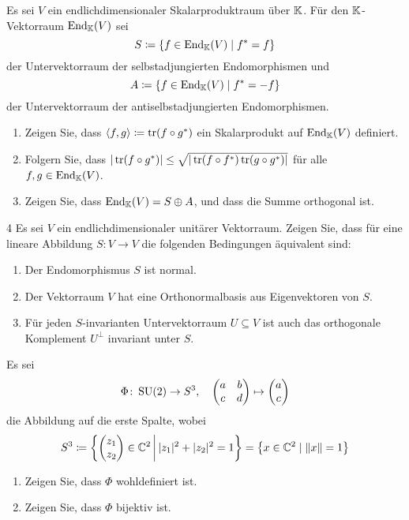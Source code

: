 

\begin{question}[subtitle = Ein Skalarprodukt auf dem Endomorphismenraum]{4}
  Es sei $V$ ein endlichdimensionaler Skalarproduktraum über $\mathbb{K}$.
  Für den $\mathbb{K}$-Vektorraum $\operatorname{End}_{\mathbb{K}}(V)$ sei
  \[
    S \coloneqq \{ f \in \operatorname{End}_{\mathbb{K}}(V) \mid f^* = f \}
  \]
  der Untervektorraum der selbstadjungierten Endomorphismen und
  \[
    A \coloneqq \{ f \in \operatorname{End}_{\mathbb{K}}(V) \mid f^* = -f \}
  \]
  der Untervektorraum der antiselbstadjungierten Endomorphismen.
  \begin{enumerate}[leftmargin=*]
    \item
      Zeigen Sie, dass $\langle f, g \rangle \coloneqq \operatorname{tr}(f \circ g^*)$ ein Skalarprodukt auf $\operatorname{End}_{\mathbb{K}}(V)$ definiert.
    \item
      Folgern Sie, dass $|\operatorname{tr}(f \circ g^*)| \leq \sqrt{|\operatorname{tr}(f \circ f^*) \operatorname{tr}(g \circ g^*)|}$ für alle $f, g \in \operatorname{End}_{\mathbb{K}}(V)$.
    \item
      Zeigen Sie, dass $\operatorname{End}_{\mathbb{K}}(V) = S \oplus A$, und dass die Summe orthogonal ist.
  \end{enumerate}
\end{question}


\begin{question}[subtitle = Charakterisierungen normaler Endomorphismen für unitäre Vektorräume]{4}
  Es sei $V$ ein endlichdimensionaler unitärer Vektorraum.
  Zeigen Sie, dass für eine lineare Abbildung $S \colon V \to V$ die folgenden Bedingungen äquivalent sind:
  \begin{enumerate}
    \item
      Der Endomorphismus $S$ ist normal.
    \item
      Der Vektorraum $V$ hat eine Orthonormalbasis aus Eigenvektoren von $S$.
    \item
      Für jeden $S$-invarianten Untervektorraum $U \subseteq V$ ist auch das orthogonale Komplement $U^\perp$ invariant unter $S$.
  \end{enumerate}
\end{question}


\begin{question}[subtitle = Eine Charakterisierung von $\SUnitary(2)$]{4}
  Es sei
  \[
    \Phi \colon \operatorname{SU}(2) \to S^3,
    \quad
    \begin{pmatrix}
      a & b \\
      c & d
    \end{pmatrix}
    \mapsto
    \begin{pmatrix} a \\ c \end{pmatrix}
  \]
  die Abbildung auf die erste Spalte, wobei
  \[
              S^3
    \coloneqq \left\{ \begin{pmatrix} z_1 \\ z_2 \end{pmatrix} \in \mathbb{C}^2 \,\middle|\, |z_1|^2 + |z_2|^2 = 1 \right\}
    =         \left\{ x \in \mathbb{C}^2 \mid \|x\| = 1 \right\}
  \]
  \begin{enumerate}[leftmargin=*]
    \item
      Zeigen Sie, dass $\Phi$ wohldefiniert ist.
    \item
      Zeigen Sie, dass $\Phi$ bijektiv ist.
  \end{enumerate}
\end{question}
